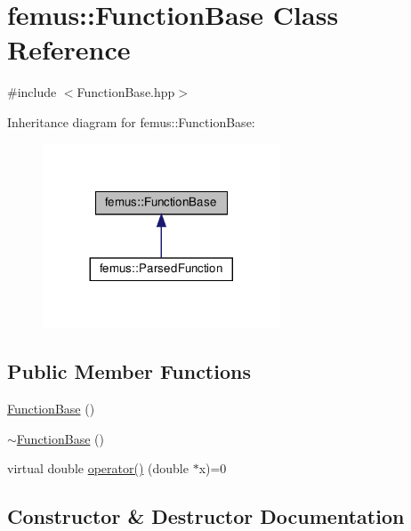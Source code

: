 \hypertarget{classfemus_1_1_function_base}{}\section{femus\+:\+:Function\+Base Class Reference}
\label{classfemus_1_1_function_base}


{\ttfamily \#include $<$Function\+Base.\+hpp$>$}



Inheritance diagram for femus\+:\+:Function\+Base\+:
\nopagebreak
\begin{figure}[H]
\begin{center}
\leavevmode
\includegraphics[width=200pt]{classfemus_1_1_function_base__inherit__graph}
\end{center}
\end{figure}
\subsection*{Public Member Functions}
\begin{DoxyCompactItemize}
\item 
\mbox{\hyperlink{classfemus_1_1_function_base_af4c86d0094568430f28d9516e8d678a9}{Function\+Base}} ()
\item 
\mbox{\hyperlink{classfemus_1_1_function_base_a2e7f18ae75ee32d4fdd5de8df7e14c5d}{$\sim$\+Function\+Base}} ()
\item 
virtual double \mbox{\hyperlink{classfemus_1_1_function_base_a2fdb73dd9cf7c4f4c4bdf28e4ee7f488}{operator()}} (double $\ast$x)=0
\end{DoxyCompactItemize}


\subsection{Constructor \& Destructor Documentation}
\mbox{\label{classfemus_1_1_function_base_af4c86d0094568430f28d9516e8d678a9}} 
